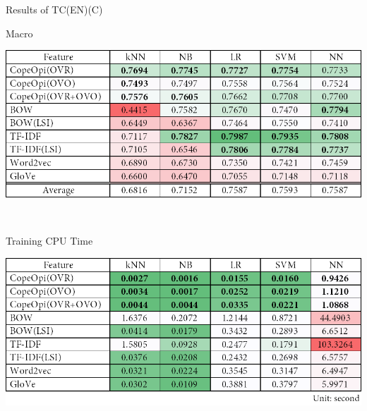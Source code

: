 \begin{table}[H]
\caption{Results of TC(EN)(C)}
\label{tab:tc_en_c}
\centering
\begin{subtable}{\textwidth}
	\centering
	\caption{Macro \fscore{}}
	\includegraphics[width=\resultfigwidth]{chapters/ch4/table/tc/TC(EN)(C).png}
\end{subtable}
\\[\tblskip]
\begin{subtable}{\textwidth}
	\centering
	\caption{Training CPU Time}
	\includegraphics[width=\resultfigwidth]{chapters/ch4/table/tc/TC(EN)(C)T.png}
\end{subtable}
\end{table}
